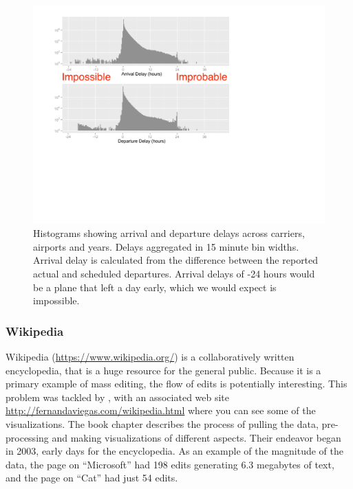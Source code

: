 \documentclass{article}
\begin{document}
\begin{figure}[t]
\centerline{\includegraphics[width=5in]{images/airlines1.pdf}}
\caption{Histograms showing arrival and departure delays across carriers, airports and years. Delays aggregated in 15 minute bin widths. Arrival delay is calculated from the difference between the reported actual and scheduled departures. Arrival delays of -24 hours would be a plane that left a day early, which we would expect is impossible. }
\label{airlines1}
\end{figure}

\subsubsection{Wikipedia}

Wikipedia (\url{https://www.wikipedia.org/}) is a collaboratively written encyclopedia, that is a huge resource for the general public. Because it is a primary example of mass editing, the flow of edits is potentially interesting. This problem was tackled by \citet{wiki}, with an associated web site \url{http://fernandaviegas.com/wikipedia.html} where you can see some of the visualizations. The book chapter describes the process of pulling the data, pre-processing and making visualizations of different aspects. Their endeavor began in 2003, early days for the encyclopedia. As an example of the magnitude of the data, the page on ``Microsoft'' had 198 edits generating 6.3 megabytes of text, and the page on ``Cat'' had just 54 edits. 
\end{document}
